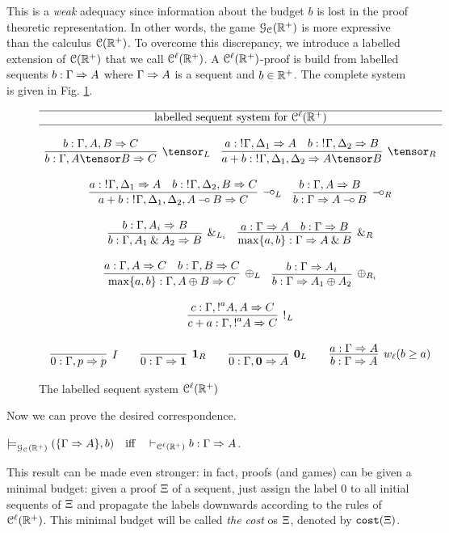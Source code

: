This is a \emph{weak} adequacy since information about the budget $b$ is lost in the proof theoretic representation. In other words, the game $\mathcal{G}_{\mathcal{C}}(\mathbb{R}^+)$ is more expressive than the calculus $\mathcal{C}(\mathbb{R}^+)$.
To overcome this discrepancy, we introduce a  labelled extension of $\mathcal{C}(\mathbb{R}^+)$ that we call $\mathcal{C}^\ell(\mathbb{R}^+)$. A $\mathcal{C}^\ell(\mathbb{R}^+)$-proof is build from labelled sequents $b: \Gamma\Rightarrow A$ where $\Gamma\Rightarrow A$ is a sequent and $b\in\mathbb{R}^+$. The complete system is given in Fig. \ref{fig:lll}. 
\begin{figure}[t]
{
\[
\begin{array}{c}
\hline\mbox{labelled sequent system for }\laIMALLR\\\hline\\
 \infer[\tensor_L]{b: \Gamma, A \tensor B \seq C}
{b: \Gamma, A, B \seq C} 
\quad 
\infer[\tensor_R]{a+b:\nbang{}\Gamma,\Delta_1, \Delta_2 \seq A\tensor B}
{a:\nbang{}\Gamma,\Delta_1 \seq A & b:\nbang{}\Gamma,\Delta_2 \seq B}
\\\\
\infer[\lolli_L]{a+b:\nbang{}\Gamma,\Delta_1, \Delta_2, A \lolli B \seq C}
{a:\nbang{}\Gamma,\Delta_1 \seq A & b:\nbang{}\Gamma,\Delta_2, B \seq C}
\quad 
\infer[\lolli_R]{b:\Gamma \seq A \lolli B}{b:\Gamma, A \seq B}
\\\\
 \infer[\with_{L_i}]{b:\Gamma, A_1 \with A_2 \seq B}
{b:\Gamma, A_i\seq B} 
\quad 
\infer[\with_R]{\max\{a,b\}: \Gamma \seq A \with B}
{a:\Gamma \seq A & b:\Gamma \seq B}
\\\\
\infer[\oplus_L]{\max\{a,b\}:\Gamma, A \oplus B \seq C}
{a:\Gamma, A \seq C & b:\Gamma, B \seq C}
\quad 
\infer[\oplus_{R_i}]{b:\Gamma \seq A_1 \oplus A_2}{b:\Gamma \seq A_i}
\\\\
\infer[\nbang{}_L]{c+a:\Gamma,\nbang{a}A\seq C}{c:\Gamma,\nbang{a}A,A\seq C}
\\\\
  \infer[I]{0:\Gamma,p \seq p}{} 
 \qquad
\infer[\one_R]{0:\Gamma \seq \one}{}
\qquad 
\infer[\zero_L]{0: \Gamma,\zero\seq A}{}
\qquad 
\infer[w_{\ell} (b\geq a)]{b: \Gamma\seq A}{a:\Gamma\seq A}
\end{array}
\]}\caption{The labelled sequent system $\mathcal{C}^\ell(\mathbb{R}^+)$}
\label{fig:lll}
\end{figure}
Now we can  prove the desired correspondence.
\begin{theorem}
\label{theorem:adeq2}
$\models^{}_{\mathcal{G}_{\mathcal{C}}(\mathbb{R}^+)}(\{\Gamma\Rightarrow A\},b)\quad\mbox{iff}\quad\vdash_{\mathcal{C}^\ell(\mathbb{R}^+)}b: \Gamma\Rightarrow A$. 
\end{theorem}
This result can be made even stronger: in fact, proofs (and games) can be given a minimal budget:
given a proof $\Xi$ of a sequent, just assign the label $0$ to all initial sequents 
of $\Xi$ and propagate the labels downwards according to the rules of $\mathcal{C}^\ell(\mathbb{R}^+)$. This minimal budget will be called {\em the cost} os $\Xi$, denoted by $\texttt{cost}(\Xi)$.

